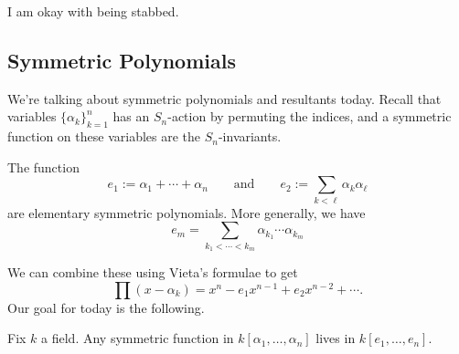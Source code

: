 















I am okay with being stabbed.

\subsection{Symmetric Polynomials}
We're talking about symmetric polynomials and resultants today. Recall that variables $\{\alpha_k\}_{k=1}^n$ has an $S_n$-action by permuting the indices, and a symmetric function on these variables are the $S_n$-invariants.
\begin{example}
	The function
	\[e_1:=\alpha_1+\cdots+\alpha_n\qquad\text{and}\qquad e_2:=\sum_{k<\ell}\alpha_k\alpha_\ell\]
	are elementary symmetric polynomials. More generally, we have
	\[e_m=\sum_{k_1<\cdots<k_m}\alpha_{k_1}\cdots\alpha_{k_m}\]
\end{example}
We can combine these using {Vieta}'s formulae to get
\[\prod(x-\alpha_k)=x^n-e_1x^{n-1}+e_2x^{n-2}+\cdots.\]
Our goal for today is the following.
\begin{theorem} \label{thm:fundsymm}
	Fix $k$ a field. Any symmetric function in $k[\alpha_1,\ldots,\alpha_n]$ lives in $k[e_1,\ldots,e_n].$
\end{theorem}
